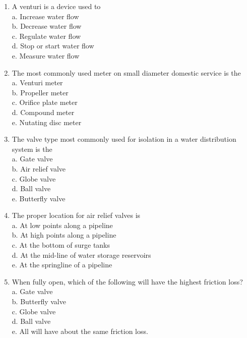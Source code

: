 \begin{enumerate}[1.]
\item A venturi is a device used to\\
a. Increase water flow\\
b. Decrease water flow\\
c. Regulate water flow\\
d. Stop or start water flow\\
e. Measure water flow\\

  \item The most commonly used meter on small diameter domestic service is the\\
a. Venturi meter\\
b. Propeller meter\\
c. Orifice plate meter\\
d. Compound meter\\
e. Nutating disc meter\\

  \item The valve type most commonly used for isolation in a water distribution system is the\\
a. Gate valve\\

b. Air relief valve\\

c. Globe valve\\

d. Ball valve\\

e. Butterfly valve\\

  \item The proper location for air relief valves is\\
a. At low points along a pipeline\\
b. At high points along a pipeline\\
c. At the bottom of surge tanks\\
d. At the mid-line of water storage reservoirs\\
e. At the springline of a pipeline\\

  \item When fully open, which of the following will have the highest friction loss?\\
a. Gate valve\\
b. Butterfly valve\\
c. Globe valve\\
d. Ball valve\\
e. All will have about the same friction loss.\\


\end{enumerate}
